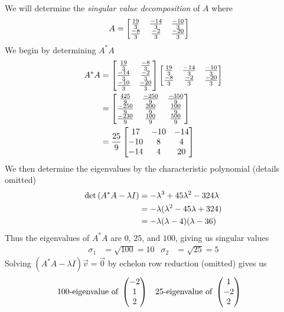 \begin{defexample}\label{longsvd}
  We will determine the \emph{singular value decomposition} of $A$ where
    \begin{align}
      A &= \begin{bmatrix}
        \frac{19}3 & \frac{-14}3 & \frac{-10}3 \\
        \frac{-8}3 & \frac{-2}3 & \frac{-20}3 \end{bmatrix}
    \end{align}
  We begin by determining $A^*A$
    \begin{align}
      A^*A &= \begin{bmatrix}
        \frac{19}3 & \frac{-8}3 \\
        \frac{-14}3 & \frac{-2}3 \\
        \frac{-10}3 & \frac{-20}3
      \end{bmatrix}\begin{bmatrix}
        \frac{19}3 & \frac{-14}3 & \frac{-10}3 \\
        \frac{-8}3 & \frac{-2}3 & \frac{-20}3
      \end{bmatrix} \\
      &= \begin{bmatrix}
        \frac{425}{9} & \frac{-250}{9} & \frac{-350}{9} \\
        \frac{-250}{9} & \frac{200}{9} & \frac{100}{9} \\
        \frac{-230}{9} & \frac{100}{9} & \frac{500}{9}
      \end{bmatrix} \\
      &= \frac{25}{9} \begin{bmatrix}
        17 & -10 & -14 \\
        -10 & 8 & 4 \\
        -14 & 4 & 20
      \end{bmatrix}
    \end{align}
  We then determine the eigenvalues by the characteristic polynomial (details omitted)
    \begin{align}
      \det\left(A^*A-\lambda I\right) &= -\lambda^3 + 45\lambda^2 - 324\lambda \\
        &= -\lambda(\lambda^2-45\lambda+324) \\
        &= -\lambda(\lambda-4)(\lambda-36)
    \end{align}
  Thus the eigenvalues of $A^*A$ are $0$, $25$, and $100$, giving us singular values
    \begin{align}
      \sigma_1 &= \sqrt{100} = 10 &
      \sigma_2 &= \sqrt{25} = 5
    \end{align}
  Solving $(A^*A-\lambda I)\vec v = \vec 0$ by echelon row reduction (omitted) gives us
    \begin{align}
      100\text{-eigenvalue of } & \pmatr{ -2 \\ 1 \\ 2 } &
      25\text{-eigenvalue of } & \pmatr{ 1 \\ -2 \\ 2 } &

\end{align}
\end{defexample}
